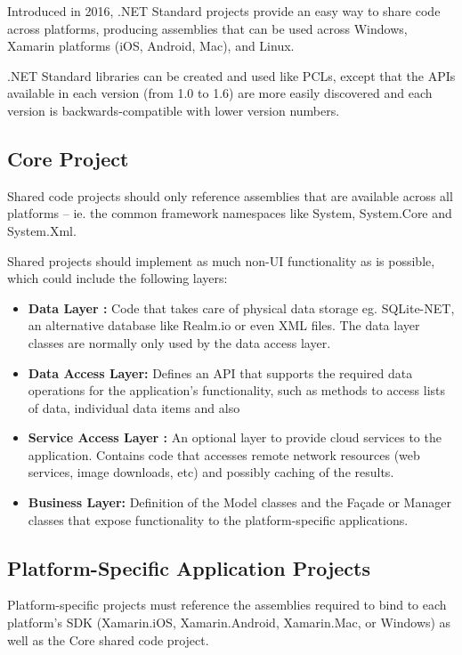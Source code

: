 Introduced in 2016, .NET Standard projects provide an easy way to share code across platforms, producing assemblies that can be used across Windows, Xamarin platforms (iOS, Android, Mac), and Linux.

.NET Standard libraries can be created and used like PCLs, except that the APIs available in each version (from 1.0 to 1.6) are more easily discovered and each version is backwards-compatible with lower version numbers.



\subsection{Core Project}
Shared code projects should only reference assemblies that are available across all platforms – ie. the common framework namespaces like System, System.Core and System.Xml.

Shared projects should implement as much non-UI functionality as is possible, which could include the following layers:
\begin{itemize}

\item \textbf{ Data Layer :}  Code that takes care of physical data storage eg. SQLite-NET, an alternative database like Realm.io or even XML files. The data layer classes are normally only used by the data access layer.
\item \textbf{Data Access Layer:}   Defines an API that supports the required data operations for the application’s functionality, such as methods to access lists of data, individual data items and also
\item \textbf{Service Access Layer :}   An optional layer to provide cloud services to the application. Contains code that accesses remote network resources (web services, image downloads, etc) and possibly caching of the results.
\item \textbf{Business Layer:}  Definition of the Model classes and the Façade or Manager classes that expose functionality to the platform-specific applications.


\end{itemize}


\subsection{Platform-Specific Application Projects}
Platform-specific projects must reference the assemblies required to bind to each platform’s SDK (Xamarin.iOS, Xamarin.Android, Xamarin.Mac, or Windows) as well as the Core shared code project.

